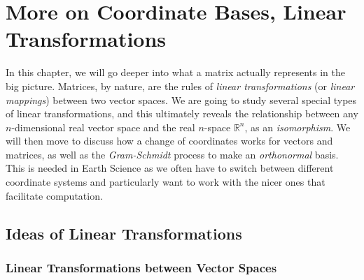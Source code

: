 \chapter{More on Coordinate Bases, Linear Transformations}
\label{chap:6x}

In this chapter, we will go deeper into what a matrix actually represents in the big picture. Matrices, by nature, are the rules of \textit{linear transformations} (or \textit{linear mappings}) between two vector spaces. We are going to study several special types of linear transformations, and this ultimately reveals the relationship between any $n$-dimensional real vector space and the real $n$-space $\mathbb{R}^n$, as an \textit{isomorphism}. We will then move to discuss how a change of coordinates works for vectors and matrices, as well as the \textit{Gram-Schmidt} process to make an \textit{orthonormal} basis. This is needed in Earth Science as we often have to switch between different coordinate systems and particularly want to work with the nicer ones that facilitate computation.

\section{Ideas of Linear Transformations}
\label{section:lineartrans}

\subsection{Linear Transformations between Vector Spaces}

